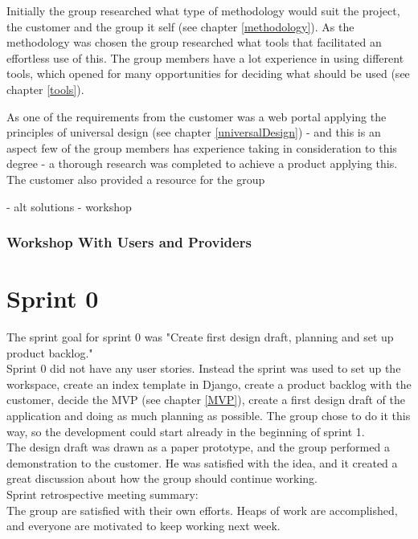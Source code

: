 Initially the group researched what type of methodology would suit the project, the customer and the group it self (see chapter \ref{methodology}). As the methodology was chosen the group researched what tools that facilitated an effortless use of this. The group members have a lot experience in using different tools, which opened for many opportunities for deciding what should be used (see chapter \ref{tools}).

As one of the requirements from the customer was a web portal applying the principles of universal design (see chapter \ref{universalDesign}) - and this is an aspect few of the group members has experience taking in consideration to this degree - a thorough research was completed to achieve a product applying this. The customer also provided a resource for the group  


- alt solutions
- workshop



\subsubsection{Workshop With Users and Providers}

\section{Sprint 0}
The sprint goal for sprint 0 was "Create first design draft, planning and set up product backlog." \\

Sprint 0 did not have any user stories. Instead the sprint was used to set up the workspace, create an index template in Django, create a product backlog with the customer, decide the MVP (see chapter \ref{MVP}), create a first design draft of the application and doing as much planning as possible. The group chose to do it this way, so the development could start already in the beginning of sprint 1. \\

The design draft was drawn as a paper prototype, and the group performed a demonstration to the customer. He was satisfied with the idea, and it created a great discussion about how the group should continue working. \\

Sprint retrospective meeting summary:\\
The group are satisfied with their own efforts. Heaps of work are accomplished, and everyone are motivated to keep working next week. \\
    
